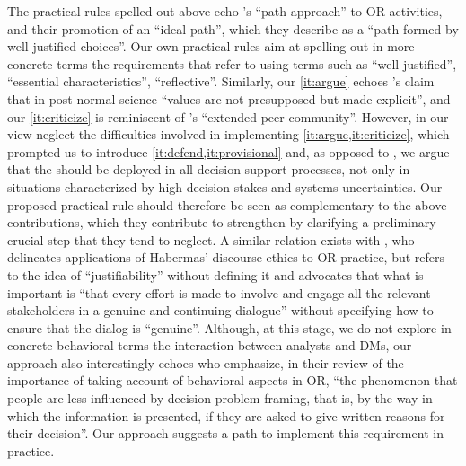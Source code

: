\documentclass[preprint, french, english, 11pt, authoryear]{elsarticle}%
\newcommand{\possessivecite}[1]{\citeauthor{#1}’s \citeyearpar{#1}}
\begin{document}
The practical rules spelled out above echo \possessivecite{lahtinen_why_2017} ``path approach'' to \ac{OR} activities, and their promotion of an ``ideal path'', which they describe as a ``path formed by well-justified choices''.
Our own practical rules aim at spelling out in more concrete terms the requirements that \citet{lahtinen_why_2017} refer to using terms such as ``well-justified'', ``essential characteristics'', ``reflective''.
Similarly, our \cref{it:argue} echoes \possessivecite{funtowicz_science_1993} claim that in post-normal science ``values are not presupposed but made explicit'', and our \cref{it:criticize} is reminiscent of \citeauthor{funtowicz_science_1993}’s ``extended peer community''.
However, in our view \citeauthor{funtowicz_science_1993} neglect the difficulties involved in implementing \cref{it:argue,it:criticize}, which prompted us to introduce \cref{it:defend,it:provisional} and, as opposed to \citeauthor{funtowicz_science_1993}, we argue that the  should be deployed in all decision support processes, 
not only in situations characterized by high decision stakes and systems uncertainties.
Our proposed practical rule should therefore be seen as complementary to the above contributions, which they contribute to strengthen by clarifying a preliminary crucial step that they tend to neglect.
A similar relation exists with \citet{mingers_ethics_2011}, who delineates applications of Habermas' discourse ethics to \ac{OR} practice, but refers to the idea of ``justifiability'' without defining it and 
advocates that what is important is ``that every effort is made to involve and engage all the relevant stakeholders in a genuine and continuing dialogue'' without specifying how to ensure that the dialog is ``genuine''.
Although, at this stage, we do not explore in concrete behavioral terms the interaction between analysts and \acp{DM}, 
our approach also interestingly echoes \citet{hamalainen_importance_2013} who emphasize, in their review of the importance of taking account of behavioral aspects in \ac{OR}, 
``the phenomenon that people are less influenced by decision problem framing, that is, by the way in which the information is presented, if they are asked to give written reasons for their decision''.
Our approach suggests a path to implement this requirement in practice.
\end{document}
